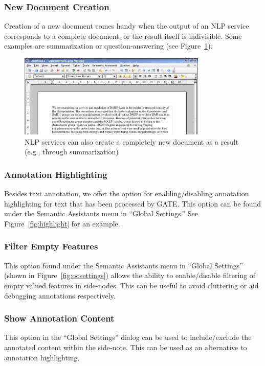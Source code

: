 \subsubsection{New Document Creation}
\label{sec:doc-cre}
Creation of a new document comes handy when the output of an NLP service
corresponds to a complete document, or the result itself is indivisible. Some
examples are summarization or question-answering (see Figure~\ref{fig:oores}).

\begin{figure}[htb]
  \centering
  \includegraphics[width=0.8\textwidth]{pictures/ooresult_clip.jpg}
  \vspace*{-2mm}
  \caption{NLP services can also create a completely new document as a
  result (e.g., through summarization)}
  \label{fig:oores}
\end{figure}

\subsubsection{Annotation Highlighting}
Besides text annotation, we offer the option for enabling/disabling annotation
highlighting for text that has been processed by GATE. This option can be
found under the Semantic Assistants menu in ``Global Settings.''  See
Figure~\ref{fig:highlight} for an example.

\subsubsection{Filter Empty Features}
This option found under the Semantic Assistants menu in ``Global Settings'' (shown
in Figure~\ref{fig:oosettings}) allows the ability to enable/disable filtering of
empty valued features in side-nodes. This can be useful to avoid cluttering or aid
debugging annotations respectively.

\subsubsection{Show Annotation Content}
This option in the ``Global Settings'' dialog can be used to include/exclude
the annotated content within the side-note. This can be used as an alternative
to annotation highlighting.

